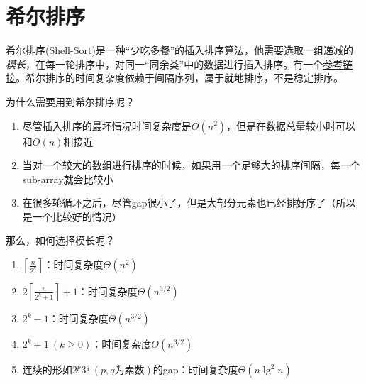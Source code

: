 \documentclass[]{report}
\begin{document}
	\section{希尔排序}
		希尔排序(Shell-Sort)是一种“少吃多餐”的插入排序算法，他需要选取一组递减的\textit{模长}，在每一轮排序中，对同一“同余类”中的数据进行插入排序。有一个\href{https://blog.csdn.net/qq_39207948/article/details/80006224}{参考链接}。希尔排序的时间复杂度依赖于间隔序列，属于就地排序，不是稳定排序。\par
		为什么需要用到希尔排序呢？
		\begin{enumerate}
			\item 尽管插入排序的最坏情况时间复杂度是$O(n^2)$，但是在数据总量较小时可以和$O(n)$相接近
			\item 当对一个较大的数组进行排序的时候，如果用一个足够大的排序间隔，每一个sub-array就会比较小
			\item 在很多轮循环之后，尽管gap很小了，但是大部分元素也已经排好序了（所以是一个比较好的情况）
		\end{enumerate}
		那么，如何选择模长呢？
		\begin{enumerate}
			\item $\left\lceil\frac{n}{2^k}\right\rceil$：时间复杂度$\Theta(n^2)$
			\item $2\left\lceil\frac{n}{2^k+1}\right\rceil+1$：时间复杂度$\Theta(n^{3/2})$
			\item $2^k-1$：时间复杂度$\Theta(n^{3/2})$
			\item $2^k+1\ (k\ge0)$：时间复杂度$\Theta(n^{3/2})$
			\item 连续的形如$2^p3^q\ (p,q\mbox{为素数})$的gap：时间复杂度$\Theta(n\lg^2n)$
		\end{enumerate}
\end{document}
